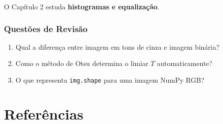\documentclass[
  portuguese,
  letterpaper,
  openany,
  oneside,
  12pt,
  a4paper]{book}
\providecommand{\tightlist}{%
  \setlength{\itemsep}{0pt}\setlength{\parskip}{0pt}}
\begin{document}
\begin{tcolorbox}
O Capítulo 2 estuda \textbf{histogramas e equalização}.

\subsection{Questões de Revisão}\label{questuxf5es-de-revisuxe3o-1}

\begin{enumerate}
\def\labelenumi{\arabic{enumi}.}
\tightlist
\item
  Qual a diferença entre imagem em tons de cinza e imagem binária?
\item
  Como o método de Otsu determina o limiar \(T\) automaticamente?
\item
  O que representa \texttt{img.shape} para uma imagem NumPy RGB?
\end{enumerate}

\printbibliography

\cleardoublepage
{}
{}
\appendix

\chapter*{Referências}\label{referuxeancias-1}


\printbibliography[heading=none]

\end{tcolorbox}


\backmatter
\end{document}
